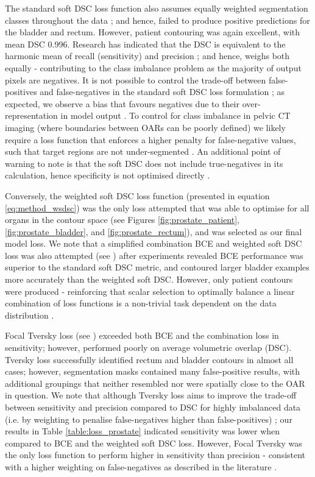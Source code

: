 The standard soft DSC loss function also assumes equally weighted segmentation classes throughout the data \cite{Sudre_2017}; and hence, failed to produce positive predictions for the bladder and rectum. However, patient contouring was again excellent, with mean DSC 0.996. Research has indicated that the DSC is equivalent to the harmonic mean of recall (sensitivity) and precision \cite{Bebis2019}; and hence, weighs both equally \cite{Bebis2019} - contributing to the class imbalance problem as the majority of output pixels are negatives. It is not possible to control the trade-off between false-positives and false-negatives in the standard soft DSC loss formulation \cite{taghanaki2018}; as expected, we observe a bias that favours negatives due to their over-representation in model output \cite{taghanaki2018}.  To control for class imbalance in pelvic CT imaging (where boundaries between OARs can be poorly defined) we likely require a loss function that enforces a higher penalty for false-negative values, such that target regions are not under-segmented \cite{taghanaki2018}. An additional point of warning to note is that the soft DSC does not include true-negatives in its calculation, hence specificity is not optimised directly \cite{taghanaki2018}.

 Conversely, the weighted soft DSC loss function (presented in equation \ref{eq:method_wsdsc}) was the only loss attempted that was able to optimise for all organs in the contour space (see Figures \ref{fig:prostate_patient}, \ref{fig:prostate_bladder}, and \ref{fig:prostate_rectum}), and was selected as our final model loss. We note that a simplified combination BCE and weighted soft DSC loss was also attempted (see \cite{taghanaki2018}) after experiments revealed BCE performance was superior to the standard soft DSC metric, and contoured larger bladder examples more accurately than the weighted soft DSC. However, only patient contours were produced - reinforcing that scalar selection to optimally balance a linear combination of loss functions is a non-trivial task dependent on the data distribution \cite{Bertels2019}. 
 
 Focal Tversky loss (see \cite{Khan2019}) exceeded both BCE and the combination loss in sensitivity; however, performed poorly on average volumetric overlap (DSC). Tversky loss successfully identified rectum and bladder contours in almost all cases; however, segmentation masks contained many false-positive results, with additional groupings that neither resembled nor were spatially close to the OAR in question. We note that although Tversky loss aims to improve the trade-off between sensitivity and precision compared to DSC for highly imbalanced data (i.e. by weighting to penalise false-negatives higher than false-positives) \cite{taghanaki2018}; our results in Table \ref{table:loss_prostate} indicated sensitivity was lower when compared to BCE and the weighted soft DSC loss. However, Focal Tversky was the only loss function to perform higher in sensitivity than precision - consistent with a higher weighting on false-negatives as described in the literature \cite{Khan2019}.

